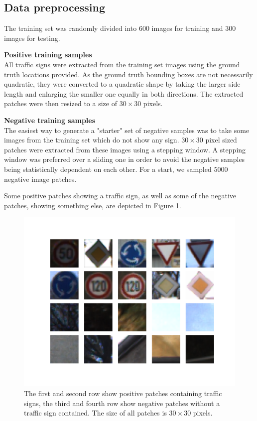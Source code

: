 \documentclass[12pt,a4paper,bibliography=totocnumbered,listof=totocnumbered]{scrartcl}
\begin{document}
\subsection{Data preprocessing}
The training set was randomly divided into 600 images for training and 300 images for testing. 

\textbf{Positive training samples} \\
All traffic signs were extracted from the training set images using the ground truth locations provided. As the ground truth bounding boxes are not necessarily quadratic, they were converted to a quadratic shape by taking the larger side length and enlarging the smaller one equally in both directions. The extracted patches were then resized to a size of $30 \times 30$ pixels.  

\textbf{Negative training samples} \\
The easiest way to generate a "starter" set of negative samples was to take some images from the training set which do not show any sign. $30 \times 30 $ pixel sized patches were extracted from these images using a stepping window. A stepping window was preferred over a sliding one in order to avoid the negative samples being statistically dependent on each other. For a start, we sampled $5000$ negative image patches.

Some positive patches showing a traffic sign, as well as some of the negative patches, showing something else, are depicted in Figure \ref{fig:posnegpatch}. 

\begin{figure}[H]
\centering
  \includegraphics[width=0.6\linewidth]{pos_neg_patches.png}
  \caption{The first and second row show positive patches containing traffic signs, the third and fourth row show negative patches without a traffic sign contained. The size of all patches is $30 \times 30$ pixels.}
  \label{fig:posnegpatch}
\end{figure}
\end{document}
